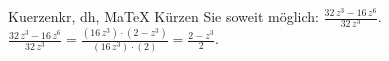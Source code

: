 \begin{MAufgabe}{Kuerzen}{kr, dh, MaTeX}
K\"urzen Sie soweit m\"oglich: $\frac{32\, z^3 - 16\, z^6}{32\, z^3}$.\\ 
\ifLsg\MLoesung
\quad $\frac{32\, z^3 - 16\, z^6}{32\, z^3}=\frac{(16\, z^3)\cdot(2 - z^3)}{(16\, z^3)\cdot(2)}=\frac{2 - z^3}{2}$.\else\relax\fi
 \end{MAufgabe}